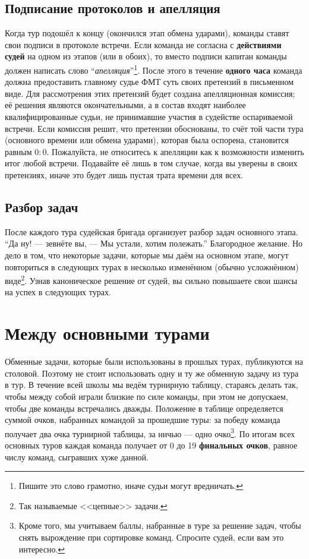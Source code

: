\documentclass[12pt]{article}
\begin{document}
\subsection*{Подписание протоколов и апелляция}
Когда тур подошёл к концу (окончился этап обмена ударами), команды ставят свои подписи в протоколе встречи. Если команда не согласна с {\bf действиями судей} на одном из этапов (или в обоих), то вместо подписи капитан команды должен написать слово ``\textsl{апелляция}''\footnote{Пишите это слово грамотно, иначе судьи могут вредничать.}. После этого в течение {\bf одного часа} команда должна предоставить главному судье ФМТ суть своих претензий в письменном виде. Для рассмотрения этих претензий будет создана апелляционная комиссия; её решения являются окончательными, а в состав входят наиболее квалифицированные судьи, не принимавшие участия в судействе оспариваемой встречи. Если комиссия решит, что претензии обоснованы, то счёт той части тура (основного времени или обмена ударами), которая была оспорена, становится равным $0:0$. Пожалуйста, не относитесь к апелляции как к возможности изменить итог любой встречи. Подавайте её лишь в том случае, когда вы уверены в своих претензиях, иначе это будет лишь пустая трата времени для всех.

\subsection*{Разбор задач}
После каждого тура судейская бригада организует разбор задач основного этапа. ``Да ну! --- зевнёте вы, --- Мы устали, хотим полежать.'' Благородное желание. Но дело в том, что некоторые задачи, которые мы даём на основном этапе, могут повториться в следующих турах в несколько изменённом (обычно усложнённом) виде\footnote{Так называемые <<цепные>> задачи.}. Узнав каноническое решение от судей, вы сильно повышаете свои шансы на успех в следующих турах.

\section*{Между основными турами}
Обменные задачи, которые были использованы в прошлых турах, публикуются на столовой. Поэтому не стоит использовать одну и ту же обменную задачу из тура в тур. В течение всей школы мы ведём турнирную таблицу, стараясь делать так, чтобы между собой играли близкие по силе команды, при этом не допускаем, чтобы две команды встречались дважды. Положение в таблице определяется суммой очков, набранных командой за прошедшие туры: за победу команда получает два очка турнирной таблицы, за ничью --- одно очко\footnote{Кроме того, мы учитываем баллы, набранные в туре за решение задач, чтобы снять вырождение при сортировке команд. Спросите судей, если вам это интересно.}. По итогам всех основных туров каждая команда получает от 0 до 19 {\bf финальных очков}, равное числу команд, сыгравших хуже данной.
\end{document}
